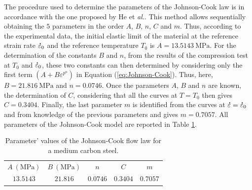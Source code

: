 \documentclass[twoside,english,1p,final,sort&compress]{elsarticle}
\makeatletter
\theoremstyle{plain}
\DeclareRobustCommand{\mdot}[1]{\accentset{\mbox{\bfseries .}}{#1}}
\DeclareRobustCommand{\eal}{et \emph{al.}\@\xspace}
\DeclareRobustCommand{\MPa}{\text{MPa}}
\makeatother
\begin{document}
The procedure used to determine the parameters of the Johnson-Cook law is in accordance with the one proposed by He \eal \cite{He-2013}.
This method allows sequentially obtaining the $5$ parameters in the order $A$, $B$, $n$, $C$ and $m$.
Thus, according to the experimental data, the initial elastic limit of the material at the reference strain rate $\mdot\varepsilon_0$ and the reference temperature $T_0$ is $A=13.5143~\MPa$.
For the determination of the constants $B$ and $n$, from the results of the compression test at $T_0$ and $\mdot\varepsilon_0$, these two constants can then determined by considering only the first term $\left(A+B\varepsilon^{p^{n}}\right)$ in Equation (\ref{eq:Johnson-Cook}). Thus, here, $B=21.816~\MPa$ and $n=0.0746$. Once the parameters $A$, $B$ and $n$ are known, the determination of $C$, considering that all the curves at $T=T_0$ then gives $C=0.3404$. Finally, the last parameter $m$ is identified from the curves at $\mdot\varepsilon=\mdot\varepsilon_0$ and from knowledge of the previous parameters and gives $m=0.7057$. All parameters of the Johnson-Cook model are reported in Table \ref{tab:JC}.

\begin{table}[h!]
\centering
\caption{Parameter' values of the Johnson-Cook flow law for a medium carbon steel.}
\begin{tabular}{ccccc}
	\hline
	$A~(\MPa)$ & $B~(\MPa)$ &   $n$    &   $C$    &   $m$    \\
	   $13.5143$     &     $21.816$     & $0.0746$ & $0.3404$ & $0.7057$ \\ \hline
\end{tabular}
\label{tab:JC}
\end{table}
\end{document}
